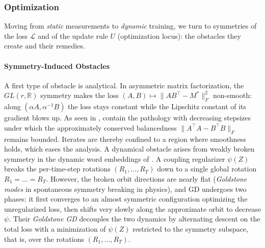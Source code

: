 \documentclass[mathematics,review,submit,moreauthors]{Definitions/mdpi}
\begin{document}
\subsubsection{Optimization}\label{sec:symmetry-optimization}
Moving from \emph{static} measurements to \emph{dynamic} training, we turn to symmetries of the loss $\mathcal L$ and of the update rule $U$ (optimization locus): the obstacles they create and their remedies.

\paragraph{Symmetry-Induced Obstacles}
A first type of obstacle is analytical.
In asymmetric matrix factorization, the $GL(r,\mathbb{R})$ symmetry makes the loss $(A,B)\mapsto\lVert AB^{\top}-M^{*}\rVert_F^2$ non-smooth: along $(\alpha A,\alpha^{-1}B)$ the loss stays constant while the Lipschitz constant of its gradient blows up.
As seen in , \citet{du2018anips} contain the pathology with decreasing stepsizes under which the approximately conserved balancedness $\lVert A^{\top}A-B^{\top}B\rVert_F$ remains bounded.
Iterates are thereby confined to a region where smoothness holds, which eases the analysis.
A dynamical obstacle arises from weakly broken symmetry in the dynamic word embeddings of \citet{bamler2018p3icml}.
A coupling regularizer $\psi(Z)$ breaks the per-time-step rotations $(R_1,\dots,R_T)$ down to a single global rotation $R_1=\dots=R_T$.
However, the broken orbit directions are nearly flat (\emph{Goldstone modes} in spontaneous symmetry breaking in physics), and GD undergoes two phases: it first converges to an almost symmetric configuration optimizing the unregularized loss, then shifts very slowly along the approximate orbit to decrease $\psi$.
Their \emph{Goldstone GD} decouples the two dynamics by alternating descent on the total loss with a minimization of $\psi(Z)$ restricted to the symmetry subspace, that is, over the rotations $(R_1,\dots,R_T)$.
\end{document}
